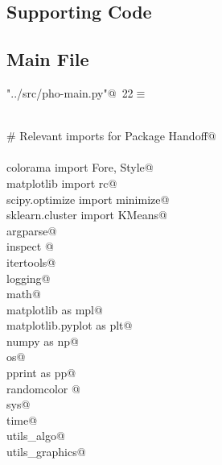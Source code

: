 \documentclass[10.0pt]{report}
\begin{document}
\begin{appendices}
\chapter{Supporting Code}

\section{Main File}



\begin{flushleft} \small\label{scrap10}\raggedright\small
{} \verb@"../src/pho-main.py"@\nobreak\ {\footnotesize {22}}$\equiv$
\vspace{-1ex}
\begin{list}{}{} \item
\mbox{}\verb@@\\
\mbox{}\verb@# Relevant imports for Package Handoff@\\
\mbox{}\verb@@\\
\mbox{}\verb@from colorama import Fore, Style@\\
\mbox{}\verb@from matplotlib import rc@\\
\mbox{}\verb@from scipy.optimize import minimize@\\
\mbox{}\verb@from sklearn.cluster import KMeans@\\
\mbox{}\verb@import argparse@\\
\mbox{}\verb@import inspect @\\
\mbox{}\verb@import itertools@\\
\mbox{}\verb@import logging@\\
\mbox{}\verb@import math@\\
\mbox{}\verb@import matplotlib as mpl@\\
\mbox{}\verb@import matplotlib.pyplot as plt@\\
\mbox{}\verb@import numpy as np@\\
\mbox{}\verb@import os@\\
\mbox{}\verb@import pprint as pp@\\
\mbox{}\verb@import randomcolor @\\
\mbox{}\verb@import sys@\\
\mbox{}\verb@import time@\\
\mbox{}\verb@import utils_algo@\\
\mbox{}\verb@import utils_graphics@\\
\mbox{}\verb@@\\

\end{list}
\end{flushleft}
\end{appendices}
\end{document}
